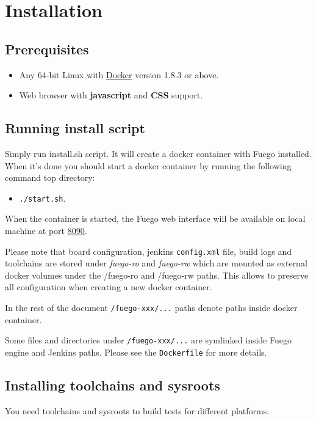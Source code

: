 \section{Installation}
\label{sec:install}

\subsection{Prerequisites}
\label{sec:prereq}

\begin{itemize}
\item Any 64-bit Linux with \href{https://www.docker.com/}{Docker} version 1.8.3 or above.
\item Web browser with \textbf{javascript} and \textbf{CSS} support.
\end{itemize}
\subsection{Running install script}
\label{sec:inst-steps}

Simply run install.sh script. It will create a docker container with Fuego installed. When it's done you should start a docker container by running the following command top directory:
\begin{itemize}
\item \texttt{./start.sh}.
\end{itemize}

When the container is started, the Fuego web interface will be available on local machine at port \href{http://localhost:8090}{8090}.

Please note that board configuration, jenkins \texttt{config.xml} file, build logs and toolchains are stored under \textit{fuego-ro} and \textit{fuego-rw} which are mounted as external docker volumes under the /fuego-ro and /fuego-rw paths. This allows to preserve all configuration when creating a new docker container.

In the rest of the document \texttt{/fuego-xxx/...} paths denote paths inside docker container.

Some files and directories under \texttt{/fuego-xxx/...} are symlinked inside Fuego engine and Jenkins paths. Please see the \texttt{Dockerfile} for more details.

\subsection{Installing toolchains and sysroots}
You need toolchains and sysroots to build tests for different platforms.
\label{sec:toolchain-install}
